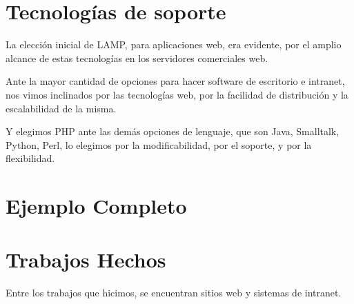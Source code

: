 \documentclass[a4paper,10pt,acm]{article}
\begin{document}
\section{Tecnologías de soporte}

La elección inicial de LAMP, para aplicaciones web, era evidente, por el amplio alcance de estas tecnologías en los servidores comerciales web.

Ante la mayor cantidad de opciones para hacer software de escritorio e intranet, nos vimos inclinados por las tecnologías web, por la facilidad
de distribución y la escalabilidad de la misma.

Y elegimos PHP ante las demás opciones de lenguaje, que son Java, Smalltalk, Python, Perl, lo elegimos por la modificabilidad, por el soporte, y
por la flexibilidad.



\section{Ejemplo Completo}
\section{Trabajos Hechos}
Entre los trabajos que hicimos, se encuentran sitios web y sistemas de intranet.

\end{document}
